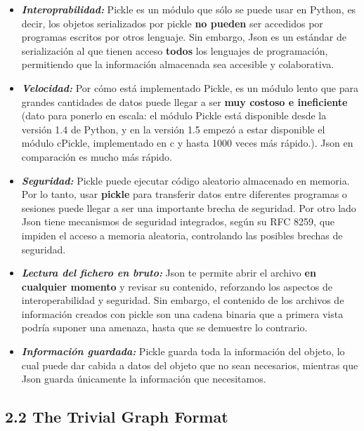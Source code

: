 \documentclass[11pt]{article}
\begin{document}
\begin{itemize}
\item
  \emph{\textbf{Interoprabilidad:}} Pickle es un módulo que sólo se
  puede usar en Python, es decir, los objetos serializados por pickle
  \textbf{no pueden} ser accedidos por programas escritos por otros
  lenguaje. Sin embargo, Json es un estándar de serialización al que
  tienen acceso \textbf{todos} los lenguajes de programación,
  permitiendo que la información almacenada sea accesible y
  colaborativa.
\item
  \emph{\textbf{Velocidad:}} Por cómo está implementado Pickle, es un
  módulo lento que para grandes cantidades de datos puede llegar a ser
  \textbf{muy costoso e ineficiente} (dato para ponerlo en escala: el
  módulo Pickle está disponible desde la versión 1.4 de Python, y en la
  versión 1.5 empezó a estar disponible el módulo cPickle, implementado
  en c y hasta 1000 veces más rápido.). Json en comparación es mucho más
  rápido.
\item
  \emph{\textbf{Seguridad:}} Pickle puede ejecutar código aleatorio
  almacenado en memoria. Por lo tanto, usar \textbf{pickle} para
  transferir datos entre diferentes programas o sesiones puede llegar a
  ser una importante brecha de seguridad. Por otro lado Json tiene
  mecanismos de seguridad integrados, según su RFC 8259, que impiden el
  acceso a memoria aleatoria, controlando las posibles brechas de
  seguridad.
\item
  \emph{\textbf{Lectura del fichero en bruto:}} Json te permite abrir el
  archivo \textbf{en cualquier momento} y revisar su contenido,
  reforzando los aspectos de interoperabilidad y seguridad. Sin embargo,
  el contenido de los archivos de información creados con pickle son una
  cadena binaria que a primera vista podría suponer una amenaza, hasta
  que se demuestre lo contrario.
\item
  \emph{\textbf{Información guardada:}} Pickle guarda toda la
  información del objeto, lo cual puede dar cabida a datos del objeto
  que no sean necesarios, mientras que Json guarda únicamente la
  información que necesitamos.
\end{itemize}

    \subsection{2.2 The Trivial Graph
Format}\label{the-trivial-graph-format}
\end{document}
